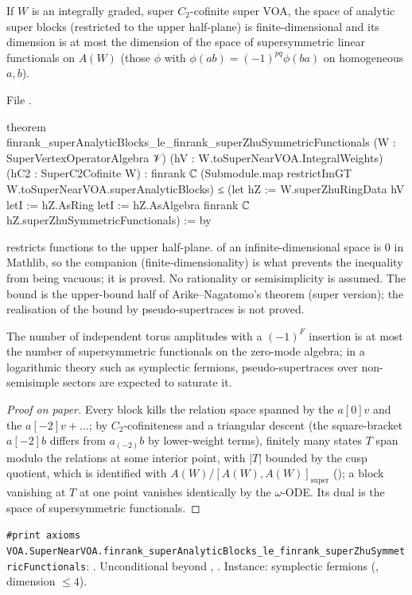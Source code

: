 \begin{theorem}\label{l17:thm:AN}
If $W$ is an integrally graded, super $C_2$-cofinite super VOA, the space of analytic super blocks
(restricted to the upper half-plane) is finite-dimensional and its dimension is at most the dimension
of the space of supersymmetric linear functionals on $A(W)$ (those $\phi$ with
$\phi(ab)=(-1)^{pq}\phi(ba)$ on homogeneous $a,b$).
\end{theorem}
\noindent File .
\begin{leancode}
theorem finrank_superAnalyticBlocks_le_finrank_superZhuSymmetricFunctionals
    (W : SuperVertexOperatorAlgebra 𝒱) (hV : W.toSuperNearVOA.IntegralWeights)
    (hC2 : SuperC2Cofinite W) :
    finrank ℂ (Submodule.map restrictImGT W.toSuperNearVOA.superAnalyticBlocks)
      ≤ (let hZ := W.superZhuRingData hV
        letI := hZ.AsRing
        letI := hZ.AsAlgebra
        finrank ℂ hZ.superZhuSymmetricFunctionals) := by
\end{leancode}
\begin{dictionary}
 restricts functions to the upper half-plane.  of an
infinite-dimensional space is $0$ in Mathlib, so the companion
 (finite-dimensionality) is what prevents the
inequality from being vacuous; it is proved. No rationality or semisimplicity is assumed. The bound
is the upper-bound half of Arike--Nagatomo's theorem (super version); the realisation of the bound by
pseudo-supertraces is not proved.
\end{dictionary}
\begin{physics}
The number of independent torus amplitudes with a $(-1)^F$ insertion is at most the number of
supersymmetric functionals on the zero-mode algebra; in a logarithmic theory such as symplectic
fermions, pseudo-supertraces over non-semisimple sectors are expected to saturate it.
\end{physics}
\begin{proof}[Proof on paper]
Every block kills the relation space spanned by the $a[0]v$ and the $a[-2]v+\dots$; by $C_2$-cofiniteness
and a triangular descent (the square-bracket $a[-2]b$ differs from $a_{(-2)}b$ by lower-weight terms),
finitely many states $T$ span modulo the relations at some interior point, with $|T|$ bounded by the
cusp quotient, which is identified with $A(W)/[A(W),A(W)]_{\mathrm{super}}$
(); a block vanishing at $T$ at one point vanishes identically
by the $\omega$-ODE. Its dual is the space of supersymmetric functionals.
\end{proof}
\begin{status}
\texttt{\#print axioms
VOA.SuperNearVOA.\allowbreak finrank\_superAnalyticBlocks\_\allowbreak le\_finrank\_\allowbreak superZhuSymmetricFunctionals}:
. Unconditional beyond , . Instance:
symplectic fermions (, dimension $\le4$).
\end{status}

